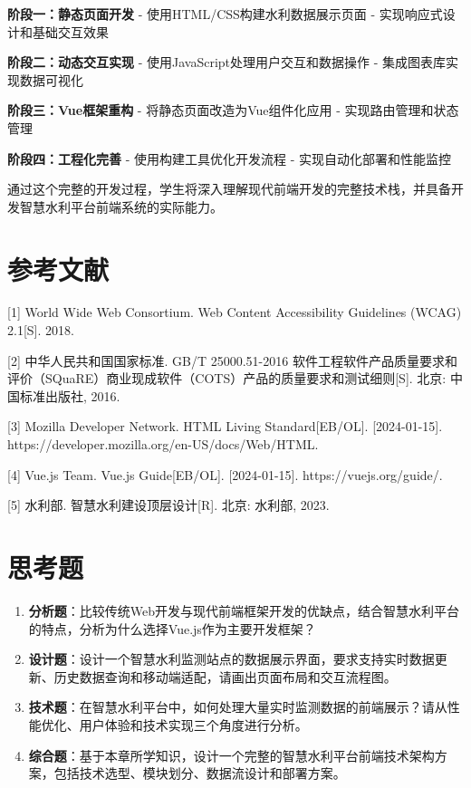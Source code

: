 \textbf{阶段一：静态页面开发} - 使用HTML/CSS构建水利数据展示页面 - 实现响应式设计和基础交互效果

\textbf{阶段二：动态交互实现} - 使用JavaScript处理用户交互和数据操作 - 集成图表库实现数据可视化

\textbf{阶段三：Vue框架重构} - 将静态页面改造为Vue组件化应用 - 实现路由管理和状态管理

\textbf{阶段四：工程化完善} - 使用构建工具优化开发流程 - 实现自动化部署和性能监控

通过这个完整的开发过程，学生将深入理解现代前端开发的完整技术栈，并具备开发智慧水利平台前端系统的实际能力。

\section{参考文献}

{[}1{]} World Wide Web Consortium. Web Content Accessibility Guidelines (WCAG) 2.1{[}S{]}. 2018.

{[}2{]} 中华人民共和国国家标准. GB/T 25000.51-2016 软件工程软件产品质量要求和评价（SQuaRE）商业现成软件（COTS）产品的质量要求和测试细则{[}S{]}. 北京: 中国标准出版社, 2016.

{[}3{]} Mozilla Developer Network. HTML Living Standard{[}EB/OL{]}. {[}2024-01-15{]}. https://developer.mozilla.org/en-US/docs/Web/HTML.

{[}4{]} Vue.js Team. Vue.js Guide{[}EB/OL{]}. {[}2024-01-15{]}. https://vuejs.org/guide/.

{[}5{]} 水利部. 智慧水利建设顶层设计{[}R{]}. 北京: 水利部, 2023.

\section{思考题}

\begin{enumerate}
\def\labelenumi{\arabic{enumi}.}
\item
  \textbf{分析题}：比较传统Web开发与现代前端框架开发的优缺点，结合智慧水利平台的特点，分析为什么选择Vue.js作为主要开发框架？
\item
  \textbf{设计题}：设计一个智慧水利监测站点的数据展示界面，要求支持实时数据更新、历史数据查询和移动端适配，请画出页面布局和交互流程图。
\item
  \textbf{技术题}：在智慧水利平台中，如何处理大量实时监测数据的前端展示？请从性能优化、用户体验和技术实现三个角度进行分析。
\item
  \textbf{综合题}：基于本章所学知识，设计一个完整的智慧水利平台前端技术架构方案，包括技术选型、模块划分、数据流设计和部署方案。
\end{enumerate}

